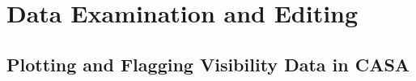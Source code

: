 






%



\chapter{Data Examination and Editing}
\label{chapter:edit}

\section{Plotting and Flagging Visibility Data in CASA}
\label{section:edit.intro}

